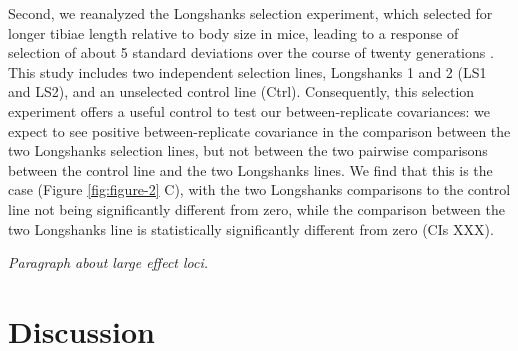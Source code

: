 \documentclass[11pt]{article}
\newcommand{\gc}[1]{{\it \color{red} #1 } }
\begin{document}
Second, we reanalyzed the Longshanks selection experiment, which selected for
longer tibiae length relative to body size in mice, leading to a response of
selection of about 5 standard deviations over the course of twenty generations
\parencite{Castro2019-uk}. This study includes two independent selection lines,
Longshanks 1 and 2 (LS1 and LS2), and an unselected control line (Ctrl).
Consequently, this selection experiment offers a useful control to test our
between-replicate covariances: we expect to see positive between-replicate
covariance in the comparison between the two Longshanks selection lines, but
not between the two pairwise comparisons between the control line and the two
Longshanks lines. We find that this is the case (Figure \ref{fig:figure-2} C),
with the two Longshanks comparisons to the control line not being significantly
different from zero, while the comparison between the two Longshanks line is
statistically significantly different from zero (CIs XXX).

\gc{Paragraph about large effect loci.}

\section{Discussion}
\end{document}
